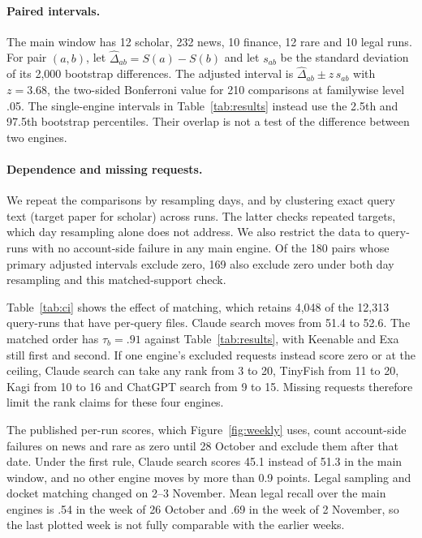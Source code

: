 \documentclass[11pt]{article}
\begin{document}
\paragraph{Paired intervals.}
The main window has 12 scholar, 232 news, 10 finance, 12 rare and 10 legal
runs. For pair $(a,b)$, let $\widehat{\Delta}_{ab}=S(a)-S(b)$ and let
$s_{ab}$ be the standard deviation of its 2,000 bootstrap differences.
The adjusted interval is $\widehat{\Delta}_{ab}\pm z\,s_{ab}$ with
$z=3.68$, the two-sided Bonferroni value for 210 comparisons at
familywise level .05. The single-engine intervals in
Table~\ref{tab:results} instead use the 2.5th and 97.5th bootstrap
percentiles. Their overlap is not a test of the difference between two
engines.

\paragraph{Dependence and missing requests.}
We repeat the comparisons by resampling days, and by clustering exact
query text (target paper for scholar) across runs. The latter checks
repeated targets, which day resampling alone does not address.
We also restrict the data to query-runs with no account-side failure in
any main engine. Of the 180 pairs whose primary adjusted intervals
exclude zero, 169 also exclude zero under both day resampling and this
matched-support check.

Table~\ref{tab:ci} shows the effect of matching, which retains 4,048 of
the 12,313 query-runs that have per-query files. Claude search moves
from 51.4 to 52.6. The matched order has $\tau_b=.91$ against
Table~\ref{tab:results}, with Keenable and Exa still first and second.
If one engine's excluded requests instead score zero or at the ceiling,
Claude search can take any rank from 3 to 20, TinyFish from 11 to 20,
Kagi from 10 to 16 and ChatGPT search from 9 to 15. Missing requests
therefore limit the rank claims for these four engines.

The published per-run scores, which Figure~\ref{fig:weekly} uses, count
account-side failures on news and rare as zero until 28 October and
exclude them after that date. Under the first rule, Claude
search scores 45.1 instead of 51.3 in the main window, and no other
engine moves by more than 0.9 points. Legal sampling and docket matching
changed on 2--3 November. Mean legal recall over the main engines is .54
in the week of 26 October and .69 in the week of 2 November, so the last
plotted week is not fully comparable with the earlier weeks.
\end{document}
